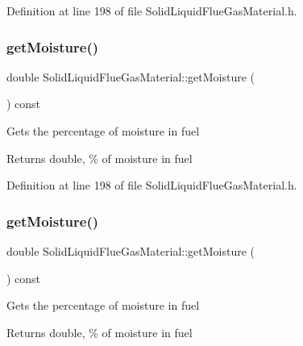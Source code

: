 Definition at line 198 of file Solid\+Liquid\+Flue\+Gas\+Material.\+h.

\mbox{\label{class_solid_liquid_flue_gas_material_accf3c8be942d0ba244f6eabab6e7012b}} 
\subsubsection{\texorpdfstring{get\+Moisture()}{getMoisture()}\hspace{0.1cm}{\footnotesize\ttfamily [2/3]}}
{\footnotesize\ttfamily double Solid\+Liquid\+Flue\+Gas\+Material\+::get\+Moisture (\begin{DoxyParamCaption}{ }\end{DoxyParamCaption}) const\hspace{0.3cm}{\ttfamily [inline]}}

Gets the percentage of moisture in fuel \begin{DoxyReturn}{Returns}
double, \% of moisture in fuel 
\end{DoxyReturn}


Definition at line 198 of file Solid\+Liquid\+Flue\+Gas\+Material.\+h.

\mbox{\label{class_solid_liquid_flue_gas_material_accf3c8be942d0ba244f6eabab6e7012b}} 
\subsubsection{\texorpdfstring{get\+Moisture()}{getMoisture()}\hspace{0.1cm}{\footnotesize\ttfamily [3/3]}}
{\footnotesize\ttfamily double Solid\+Liquid\+Flue\+Gas\+Material\+::get\+Moisture (\begin{DoxyParamCaption}{ }\end{DoxyParamCaption}) const\hspace{0.3cm}{\ttfamily [inline]}}

Gets the percentage of moisture in fuel \begin{DoxyReturn}{Returns}
double, \% of moisture in fuel 
\end{DoxyReturn}


